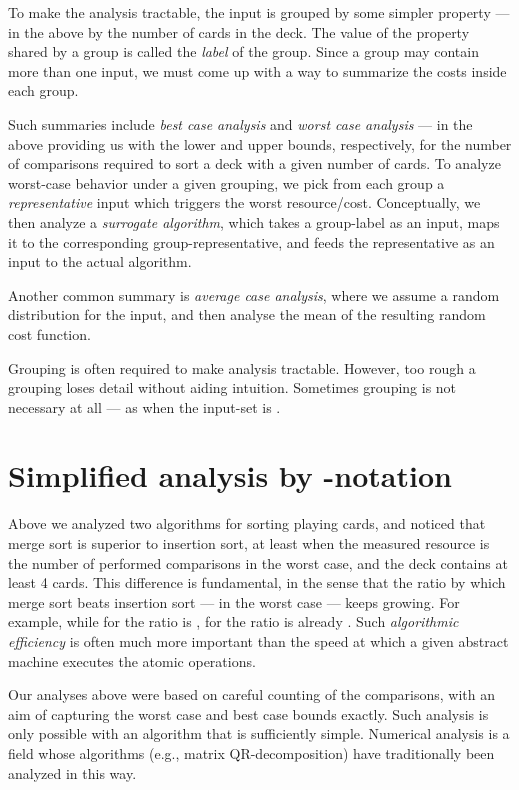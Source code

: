 \documentclass[b5paper, english, oneside]{memoir}
\begin{document}
To make the analysis tractable, the input is grouped by some simpler property --- in the above by the number of cards in the deck. The value of the property shared by a group is called the \emph{label} of the group. Since a group may contain more than one input, we must come up with a way to summarize the costs inside each group. 

Such summaries include \emph{best case analysis} and \emph{worst case analysis} --- in the above providing us with the lower and upper bounds, respectively, for the number of comparisons required to sort a deck with a given number of cards. To analyze worst-case behavior under a given grouping, we pick from each group a \emph{representative} input which triggers the worst resource\-/cost. Conceptually, we then analyze a \emph{surrogate algorithm}, which takes a group-label as an input, maps it to the corresponding group-representative, and feeds the representative as an input to the actual algorithm.

Another common summary is \emph{average case analysis}, where we assume a random distribution for the input, and then analyse the mean of the resulting random cost function.

Grouping is often required to make analysis tractable. However, too rough a grouping loses detail without aiding intuition. Sometimes grouping is not necessary at all --- as when the input-set is .

\section{Simplified analysis by \texorpdfstring{}{O}-notation}

Above we analyzed two algorithms for sorting playing cards, and noticed that merge sort is superior to insertion sort, at least when the measured resource is the number of performed comparisons in the worst case, and the deck contains at least 4 cards. This difference is fundamental, in the sense that the ratio by which merge sort beats insertion sort --- in the worst case --- keeps growing. For example, while for  the ratio is , for  the ratio is already . Such \emph{algorithmic efficiency} is often much more important than the speed at which a given abstract machine executes the atomic operations.

Our analyses above were based on careful counting of the comparisons, with an aim of capturing the worst case and best case bounds exactly. Such analysis is only possible with an algorithm that is sufficiently simple. Numerical analysis is a field whose algorithms (e.g., matrix QR-decomposition) have traditionally been analyzed in this way.
\end{document}
